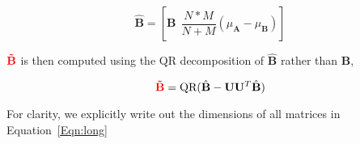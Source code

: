 \begin{equation}
\hat{\mathbf{B}}=\left[\mathbf{B} \ \ \frac{N*M}{N+M}(\mu_\mathbf{A}-\mu_\mathbf{B})\right]
\end{equation}

${\color{red}\mathbf{\tilde{B}}}$ is then computed using the QR decomposition of $\hat{\mathbf{B}}$ rather than $\mathbf{B}$,

\begin{equation}
{\color{red}\mathbf{\tilde{B}}}=\textrm{QR}(\hat{\mathbf{B}} - \mathbf{U}\mathbf{U}^T\hat{\mathbf{B}})
\end{equation}



For clarity, we explicitly write out the dimensions of all matrices in Equation~\ref{Eqn:long}

